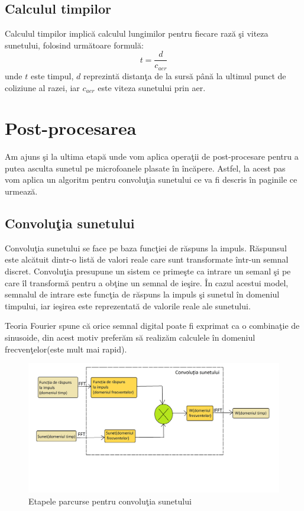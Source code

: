 \subsection{Calculul timpilor}

	Calculul timpilor implic\u{a} calculul lungimilor pentru fiecare raz\u{a} \c{s}i viteza sunetului, folosind urm\u{a}toare formul\u{a}:
	\begin{equation}
		t = \frac{d}{c_{aer}}
	\end{equation}
	unde $t$ este timpul, $d$ reprezint\u{a} distan\c{t}a de la surs\u{a} p\^{a}n\u{a} la ultimul punct de coliziune al razei, iar $c_{aer}$ este viteza sunetului prin aer.

\section{Post-procesarea}

	Am ajuns \c{s}i la ultima etap\u{a} unde vom aplica opera\c{t}ii de post-procesare pentru a putea asculta sunetul pe microfoanele plasate \^{i}n \^{i}nc\u{a}pere. Astfel, la acest pas vom aplica un algoritm pentru convolu\c{t}ia sunetului ce va fi descris \^{i}n paginile ce urmeaz\u{a}.

\subsection{Convolu\c{t}ia sunetului}

	Convolu\c{t}ia sunetului se face pe baza func\c{t}iei de r\u{a}spuns la impuls. R\u{a}spunsul este alc\u{a}tuit dintr-o list\u{a} de valori reale care sunt transformate \^{i}ntr-un semnal discret. Convolu\c{t}ia presupune un sistem ce prime\c{s}te ca intrare un semanl \c{s}i pe care \^{i}l transform\u{a} pentru a ob\c{t}ine un semnal de ie\c{s}ire. \^{I}n cazul acestui model, semnalul de intrare este func\c{t}ia de r\u{a}spuns la impuls \c{s}i sunetul \^{i}n domeniul timpului, iar ie\c{s}irea este reprezentat\u{a} de valorile reale ale sunetului.
	\bigskip 
	
	Teoria Fourier spune c\u{a} orice semnal digital poate fi exprimat ca o combina\c{t}ie de sinusoide, din acest motiv prefer\u{a}m s\u{a} realiz\u{a}m calculele \^{i}n domeniul frecven\c{t}elor(este mult mai rapid).
		
	\begin{figure}[!htb]
		\centering
		\includegraphics[width=15cm]{imagini/convolutiaSunetului.png}
		\caption{Etapele parcurse pentru convolu\c{t}ia sunetului}
		\label{Fig14}
	\end{figure}

